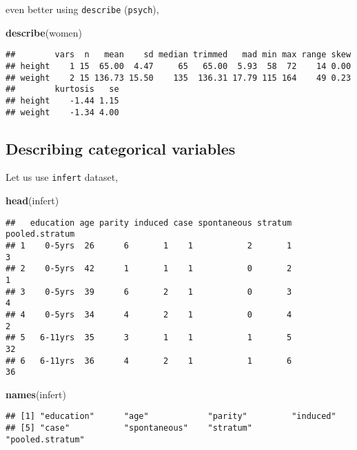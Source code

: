 \documentclass[]{book}
\newenvironment{Shaded}{\begin{snugshade}}{\end{snugshade}}
\newcommand{\KeywordTok}[1]{\textcolor[rgb]{0.13,0.29,0.53}{\textbf{{#1}}}}
\newcommand{\NormalTok}[1]{{#1}}
\theoremstyle{definition}
\theoremstyle{definition}
\theoremstyle{remark}
\begin{document}
even better using \texttt{describe} (\texttt{psych}),

\begin{Shaded}
\begin{Highlighting}[]
\KeywordTok{describe}\NormalTok{(women)}
\end{Highlighting}
\end{Shaded}

\begin{verbatim}
##        vars  n   mean    sd median trimmed   mad min max range skew
## height    1 15  65.00  4.47     65   65.00  5.93  58  72    14 0.00
## weight    2 15 136.73 15.50    135  136.31 17.79 115 164    49 0.23
##        kurtosis   se
## height    -1.44 1.15
## weight    -1.34 4.00
\end{verbatim}

\subsection{Describing categorical
variables}\label{describing-categorical-variables}

Let us use \texttt{infert} dataset,

\begin{Shaded}
\begin{Highlighting}[]
\KeywordTok{head}\NormalTok{(infert)}
\end{Highlighting}
\end{Shaded}

\begin{verbatim}
##   education age parity induced case spontaneous stratum pooled.stratum
## 1    0-5yrs  26      6       1    1           2       1              3
## 2    0-5yrs  42      1       1    1           0       2              1
## 3    0-5yrs  39      6       2    1           0       3              4
## 4    0-5yrs  34      4       2    1           0       4              2
## 5   6-11yrs  35      3       1    1           1       5             32
## 6   6-11yrs  36      4       2    1           1       6             36
\end{verbatim}

\begin{Shaded}
\begin{Highlighting}[]
\KeywordTok{names}\NormalTok{(infert)}
\end{Highlighting}
\end{Shaded}

\begin{verbatim}
## [1] "education"      "age"            "parity"         "induced"       
## [5] "case"           "spontaneous"    "stratum"        "pooled.stratum"
\end{verbatim}
\end{document}
